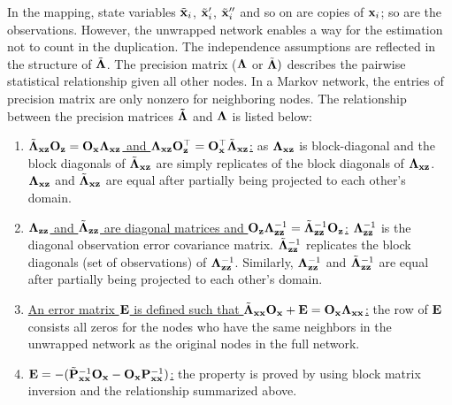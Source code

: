 In the mapping, state variables $\tilde{\bf x}_{i}$, $\tilde{\bf x}_{i}'$, $\tilde{\bf x}_{i}''$ and so on are copies of ${\bf x}_{i}$; so are the observations. However, the unwrapped network enables a way for the estimation not to count in the duplication. The independence assumptions are reflected in the structure of $\tilde{\bf \Lambda}$. The precision matrix ($\bf \Lambda$ or $\tilde{\bf \Lambda})$ describes the pairwise statistical relationship given all other nodes. In a Markov network, the entries of precision matrix are only nonzero for neighboring nodes. The relationship between the precision matrices $\bf\tilde \Lambda$ and $\bf \Lambda$ is listed below:
\begin{enumerate}
  \item \underline{${\tilde{\bf \Lambda}}_{\bf xz}{\bf O}_{\bf z}={\bf O}_{\bf x}{\bf \Lambda}_{\bf xz}$ and ${{\bf \Lambda}}_{\bf xz}{\bf O}_{\bf z}^\top={\bf O}_{\bf x}^\top\tilde{\bf \Lambda}_{\bf xz}$:} as ${\bf \Lambda}_{\bf xz}$ is block-diagonal and the block diagonals of $\tilde{\bf \Lambda}_{\bf xz}$ are simply replicates of the block diagonals of ${\bf \Lambda}_{\bf xz}$. ${\bf \Lambda}_{\bf xz}$ and $\tilde{\bf \Lambda}_{\bf xz}$ are equal after partially being projected to each other's domain.
  \item \underline{${\bf \Lambda}_{\bf zz}$ and $\tilde{\bf \Lambda}_{\bf zz}$ are diagonal matrices  and ${\bf O}_{\bf z}{\bf \Lambda}_{\bf zz}^{-1}=\tilde{\bf \Lambda}_{\bf zz}^{-1}{\bf O}_{\bf z}$:} ${\bf \Lambda}_{\bf zz}^{-1}$ is the diagonal observation error covariance matrix. $\tilde{\bf \Lambda}_{\bf zz}^{-1}$ replicates the block diagonals (set of observations) of ${\bf \Lambda}_{\bf zz}^{-1}$. Similarly, ${\bf \Lambda}_{\bf zz}^{-1}$ and $\tilde{\bf \Lambda}_{\bf zz}^{-1}$ are equal after partially being projected to each other's domain.
  \item \underline{An error matrix $\bf E$ is defined such that ${\tilde{\bf \Lambda}}_{\bf xx}{\bf O}_{\bf x}+{\bf E}={\bf O}_{\bf x}{\bf \Lambda}_{\bf xx}$:} the row of $\bf E$ consists all zeros for the nodes who have the same neighbors in the unwrapped network as the original nodes in the full network.
  \item \underline{${\bf E}=-(\tilde{\bf P}_{\bf xx}^{-1}{\bf O}_{\bf x}-{\bf O}_{\bf x}{\bf P}_{\bf xx}^{-1})$:} the property is proved by using block matrix inversion and the relationship summarized above.
\end{enumerate}

